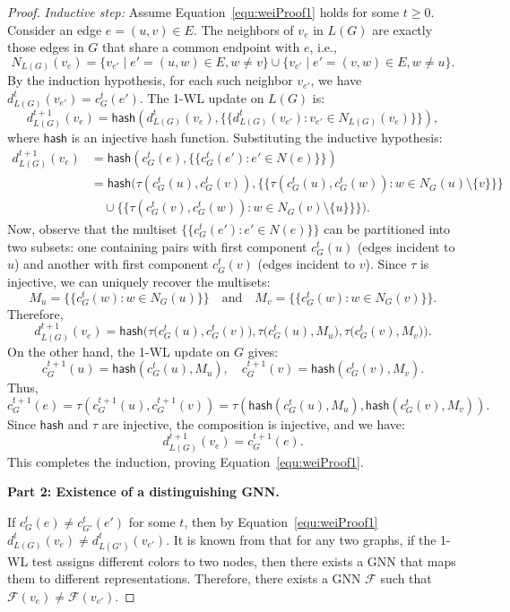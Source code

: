 \documentclass[pdflatex,sn-mathphys-num]{sn-jnl}%
\theoremstyle{thmstyleone}%
\theoremstyle{thmstyletwo}%
\theoremstyle{thmstylethree}%
\theoremstyle{plain} %
\theoremstyle{definition} %
\newcommand{\hash}{\textsf{hash}}
\theoremstyle{remark} %
\theoremstyle{plain} %
\begin{document}
\begin{proof}
\textit{Inductive step:} Assume Equation~\ref{equ:weiProof1} holds for some $t \geq 0$. Consider an edge $e = (u, v) \in E$. The neighbors of $v_e$ in $L(G)$ are exactly those edges in $G$ that share a common endpoint with $e$, i.e.,
\[
N_{L(G)}(v_e) = \{ v_{e'} \mid e' = (u, w) \in E, w \neq v \} \cup \{ v_{e'} \mid e' = (v, w) \in E, w \neq u \}.
\]
By the induction hypothesis, for each such neighbor $v_{e'}$, we have $d^t_{L(G)}(v_{e'}) = c^t_G(e')$. The 1-WL update on $L(G)$ is:
\[
d^{t+1}_{L(G)}(v_e) = \hash\left( d^t_{L(G)}(v_e), \{\{ d^t_{L(G)}(v_{e'}) : v_{e'} \in N_{L(G)}(v_e) \}\} \right),
\]
where $\hash$ is an injective hash function. Substituting the inductive hypothesis:
\begin{align*}
d^{t+1}_{L(G)}(v_e) &= \hash\left( c^t_G(e), \{\{ c^t_G(e') : e' \in N(e) \}\} \right) \\
&= \hash\Big( \tau(c^t_G(u), c^t_G(v)), \{\{ \tau(c^t_G(u), c^t_G(w)) : w \in N_G(u)\setminus\{v\} \}\} \\
&\quad \cup \{\{ \tau(c^t_G(v), c^t_G(w)) : w \in N_G(v)\setminus\{u\} \}\} \Big).
\end{align*}
Now, observe that the multiset $\{\{ c^t_G(e') : e' \in N(e) \}\}$ can be partitioned into two subsets: one containing pairs with first component $c^t_G(u)$ (edges incident to $u$) and another with first component $c^t_G(v)$ (edges incident to $v$). Since $\tau$ is injective, we can uniquely recover the multisets:
\[
M_u = \{\{ c^t_G(w) : w \in N_G(u) \}\} \quad \text{and} \quad M_v = \{\{ c^t_G(w) : w \in N_G(v) \}\}.
\]
Therefore,
\[
d^{t+1}_{L(G)}(v_e) = \hash\Big( \tau\big(c^t_G(u), c^t_G(v)\big), \tau\big(c^t_G(u), M_u\big), \tau\big(c^t_G(v), M_v\big) \Big).
\]
On the other hand, the 1-WL update on $G$ gives:
\[
c^{t+1}_G(u) = \hash(c^t_G(u), M_u), \quad c^{t+1}_G(v) = \hash(c^t_G(v), M_v).
\]
Thus,
\[
c^{t+1}_G(e) = \tau\left(c^{t+1}_G(u), c^{t+1}_G(v)\right) = \tau\left( \hash(c^t_G(u), M_u), \hash(c^t_G(v), M_v) \right).
\]
Since $\hash$ and $\tau$ are injective, the composition is injective, and we have:
\[
d^{t+1}_{L(G)}(v_e) = c^{t+1}_G(e).
\]
This completes the induction, proving Equation~\ref{equ:weiProof1}.

\noindent\textbf{Part 2: Existence of a distinguishing GNN.}

If $c^t_G(e) \neq c^t_{G'}(e')$ for some $t$, then by Equation~\ref{equ:weiProof1} $d^t_{L(G)}(v_e) \neq d^t_{L(G')}(v_{e'})$. It is known from \cite{xu2018how} that for any two graphs, if the 1-WL test assigns different colors to two nodes, then there exists a GNN that maps them to different representations. Therefore, there exists a GNN $\mathcal{F}$ such that $\mathcal{F}(v_e) \neq \mathcal{F}(v_{e'})$.


\end{proof}
\end{document}
